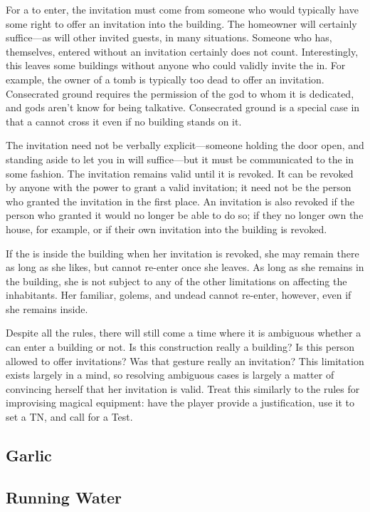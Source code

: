 For a {\vampire} to enter, the invitation must come from someone who would typically have some right to offer an invitation into the building.
The homeowner will certainly suffice---as will other invited guests, in many situations.
Someone who has, themselves, entered without an invitation certainly does not count.
Interestingly, this leaves some buildings without anyone who could validly invite the {\vampire} in.
For example, the owner of a tomb is typically too dead to offer an invitation.
Consecrated ground requires the permission of the god to whom it is dedicated, and gods aren't know for being talkative.
Consecrated ground is a special case in that a {\vampire} cannot cross it even if no building stands on it.

The invitation need not be verbally explicit---someone holding the door open, and standing aside to let you in will suffice---but it must be communicated to the {\vampire} in some fashion.
The invitation remains valid until it is revoked.
It can be revoked by anyone with the power to grant a valid invitation; it need not be the person who granted the invitation in the first place.
An invitation is also revoked if the person who granted it would no longer be able to do so; if they no longer own the house, for example, or if their own invitation into the building is revoked.

If the {\vampire} is inside the building when her invitation is revoked, she may remain there as long as she likes, but cannot re-enter once she leaves.
As long as she remains in the building, she is not subject to any of the other limitations on affecting the inhabitants.
Her familiar, golems, and undead cannot re-enter, however, even if she remains inside.

Despite all the rules, there will still come a time where it is ambiguous whether a {\vampire} can enter a building or not.
Is this construction really a building?
Is this person allowed to offer invitations?
Was that gesture really an invitation?
This limitation exists largely in a {\vampirepossessive} mind, so resolving ambiguous cases is largely a matter of convincing herself that her invitation is valid.
Treat this similarly to the rules for improvising magical equipment: have the player provide a justification, use it to set a TN, and call for a  Test.

\subsection{Garlic}



\subsection{Running Water}


